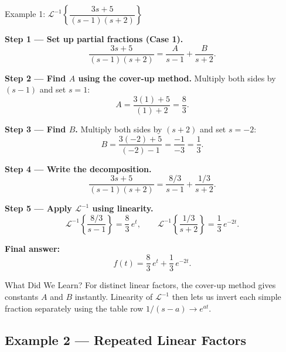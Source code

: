 \documentclass[12pt,a4paper]{article}
\begin{document}
\begin{infobox}{Example 1: $\mathcal{L}^{-1}\!\left\{\dfrac{3s+5}{(s-1)(s+2)}\right\}$}

\textbf{Step 1 --- Set up partial fractions (Case 1).}
\[
    \frac{3s+5}{(s-1)(s+2)} = \frac{A}{s-1} + \frac{B}{s+2}.
\]

\textbf{Step 2 --- Find $A$ using the cover-up method.}
Multiply both sides by $(s-1)$ and set $s = 1$:
\[
    A = \frac{3(1)+5}{(1)+2} = \frac{8}{3}.
\]

\textbf{Step 3 --- Find $B$.}
Multiply both sides by $(s+2)$ and set $s = -2$:
\[
    B = \frac{3(-2)+5}{(-2)-1} = \frac{-1}{-3} = \frac{1}{3}.
\]

\textbf{Step 4 --- Write the decomposition.}
\[
    \frac{3s+5}{(s-1)(s+2)} = \frac{8/3}{s-1} + \frac{1/3}{s+2}.
\]

\textbf{Step 5 --- Apply $\mathcal{L}^{-1}$ using linearity.}
\[
    \mathcal{L}^{-1}\!\left\{\frac{8/3}{s-1}\right\} = \frac{8}{3}\,e^{t}, \qquad
    \mathcal{L}^{-1}\!\left\{\frac{1/3}{s+2}\right\} = \frac{1}{3}\,e^{-2t}.
\]

\textbf{Final answer:}
\[
    \boxed{f(t) = \frac{8}{3}\,e^{t} + \frac{1}{3}\,e^{-2t}.}
\]
\end{infobox}

\begin{learnbox}{What Did We Learn?}
For distinct linear factors, the cover-up method gives constants $A$ and $B$
instantly.  Linearity of $\mathcal{L}^{-1}$ then lets us invert each simple
fraction separately using the table row $1/(s-a)\to e^{at}$.
\end{learnbox}

\subsection{Example 2 --- Repeated Linear Factors}
\end{document}
